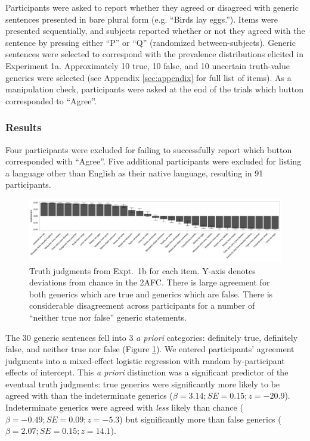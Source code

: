 \documentclass[10pt,letterpaper]{article}
\begin{document}
Participants were asked to report whether they agreed or disagreed with generic sentences presented in bare plural form (e.g. ``Birds lay eggs.''). 
Items were presented sequentially, and subjects reported whether or not they agreed with the sentence by pressing either ``P'' or ``Q'' (randomized between-subjects). 
Generic sentences were selected to correspond with the prevalence distributions elicited in Experiment 1a. 
Approximately 10 true, 10 false, and 10 uncertain truth-value generics were selected (see Appendix \ref{sec:appendix} for full list of items).
As a manipulation check, participants were asked at the end of the trials which button corresponded to ``Agree''.

\subsubsection{Results}

Four participants were excluded for failing to successfully report which button corresponded with ``Agree''. 
Five additional participants were excluded for listing a language other than English as their native language, resulting in 91 participants.


\begin{figure}
\centering
    \includegraphics[width=\columnwidth]{truhtjudge_n100}
    \caption{Truth judgments from Expt.~1b for each item. Y-axis denotes deviations from chance in the 2AFC. There is large agreement for both generics which are true and generics which are false. There is considerable disagreement across participants for a number of ``neither true nor false'' generic statements. }
  \label{fig:tj1b}
\end{figure}


The 30 generic sentences fell into 3 \emph{a priori} categories: definitely true, definitely false, and neither true nor false (Figure \ref{fig:tj1b}). We entered participants' agreement judgments into a mixed-effect logistic regression with random by-participant effects of intercept. 
This \emph{a priori} distinction was a significant predictor of the eventual truth judgments: true generics were significantly more likely to be agreed with than the indeterminate generics ($\beta = 3.14; SE = 0.15; z = -20.9$).
Indeterminate generics were agreed with \emph{less} likely than chance ($\beta = -0.49; SE = 0.09; z = -5.3$) but significantly more than false generics ($\beta = 2.07; SE = 0.15; z = 14.1$).
\end{document}
